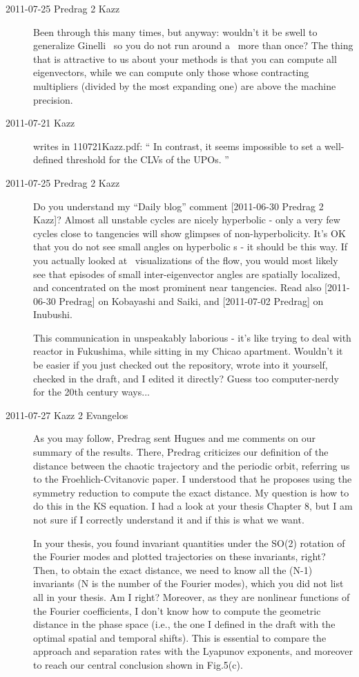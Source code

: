 \begin{description}
\item[2011-07-25 Predrag 2 Kazz]
Been through this many times, but anyway: wouldn't it be swell to
generalize Ginelli \etal\ so you do not run around a \po\ more than once?
The thing that is attractive to us about your methods is that you can
compute all eigenvectors, while we can compute only those whose
contracting multipliers (divided by the most expanding one) are above the
machine precision.

\item[2011-07-21 Kazz] writes in 110721Kazz.pdf:
``
In contrast, it seems impossible to set a well-defined threshold for the
CLVs of the UPOs.
''

\item[2011-07-25 Predrag 2 Kazz]
Do you understand my ``Daily blog'' comment  [2011-06-30 Predrag 2 Kazz]?
Almost all unstable cycles are nicely hyperbolic - only a very few cycles
close to tangencies will show glimpses of non-hyperbolicity. It's OK that
you do not see small angles on hyperbolic \po s - it should be this way.
If you actually looked at \statesp\ visualizations of the
flow, you would most likely see that
episodes of small inter-eigenvector angles are spatially localized, and
concentrated on the most prominent near tangencies. Read also [2011-06-30
Predrag] on Kobayashi and Saiki, and [2011-07-02 Predrag] on Inubushi.

This communication in unspeakably laborious - it's like trying to deal
with reactor in Fukushima, while sitting in my Chicao apartment. Wouldn't
it be easier if you just checked out the repository, wrote into it
yourself, checked in the draft, and I edited it directly? Guess too
computer-nerdy for the 20th century ways...

\item[2011-07-27 Kazz 2 Evangelos] As you may follow, Predrag sent Hugues
and me comments on our summary of the results. There, Predrag criticizes
our definition of the distance between the chaotic trajectory and the
periodic orbit, referring us to the Froehlich-Cvitanovic paper. I
understood that he proposes using the symmetry reduction to compute the
exact distance. My question is how to do this in the KS equation. I had a
look at your thesis Chapter 8, but I am not sure if I correctly
understand it and if this is what we want.

In your thesis, you found invariant quantities under the SO(2) rotation
of the Fourier modes and plotted trajectories on these invariants, right?
Then, to obtain the exact distance, we need to know all the (N-1)
invariants (N is the number of the Fourier modes), which you did not list
all in your thesis. Am I right? Moreover, as they are nonlinear functions
of the Fourier coefficients, I don't know how to compute the geometric
distance in the phase space (i.e., the one I defined in the draft with
the optimal spatial and temporal shifts). This is essential to compare
the approach and separation rates with the Lyapunov exponents, and
moreover to reach our central conclusion shown in Fig.5(c).


\end{description}
